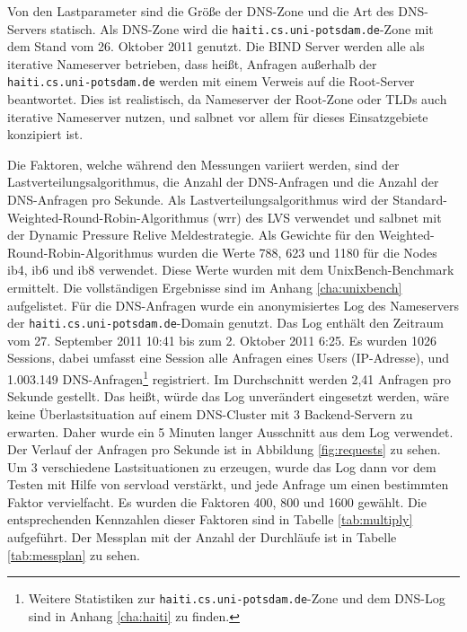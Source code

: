 \documentclass[a4paper, 12pt, BCOR10mm, DIV12, toc=bibliography, toc=listof, german]{scrbook}
\begin{document}
			Von den Lastparameter sind die Größe der DNS-Zone und die Art des DNS-Servers statisch. Als
			DNS-Zone wird die \texttt{haiti.cs.uni-potsdam.de}-Zone mit dem Stand vom 26.  Oktober 2011
			genutzt. Die BIND Server werden alle als iterative Nameserver betrieben, dass heißt, Anfragen
			außerhalb der \texttt{haiti.cs.uni-potsdam.de} werden mit einem Verweis auf die Root-Server
			beantwortet. Dies ist realistisch, da Nameserver der Root-Zone oder TLDs auch iterative
			Nameserver nutzen, und salbnet vor allem für dieses Einsatzgebiete konzipiert ist.

			Die Faktoren, welche während den Messungen variiert werden, sind der
			Lastverteilungsalgorithmus, die Anzahl der DNS-Anfragen und die Anzahl der DNS-Anfragen pro
			Sekunde. Als Lastverteilungsalgorithmus wird der Standard-Weighted-Round-Robin-Algorithmus
			(wrr) des LVS verwendet und salbnet mit der Dynamic Pressure Relive Meldestrategie. Als Gewichte
			für den Weighted-Round-Robin-Algorithmus wurden die Werte 788, 623 und 1180 für die Nodes ib4,
			ib6 und ib8 verwendet. Diese Werte wurden mit dem UnixBench-Benchmark \cite{unixbench}
			ermittelt. Die vollständigen Ergebnisse sind im Anhang \ref{cha:unixbench} aufgelistet. Für
			die DNS-Anfragen wurde ein anonymisiertes Log des Nameservers der
			\texttt{haiti.cs.uni-potsdam.de}-Domain genutzt. Das Log enthält den Zeitraum vom 27.
			September 2011 10:41 bis zum 2. Oktober 2011 6:25. Es wurden 1026 Sessions, dabei umfasst eine
			Session alle Anfragen eines Users (IP-Adresse), und 1.003.149 DNS-Anfragen\footnote{Weitere
			Statistiken zur \texttt{haiti.cs.uni-potsdam.de}-Zone und dem DNS-Log sind in Anhang
			\ref{cha:haiti} zu finden.} registriert. Im Durchschnitt werden 2,41 Anfragen pro Sekunde
			gestellt. Das heißt, würde das Log unverändert eingesetzt werden, wäre keine Überlastsituation
			auf einem DNS-Cluster mit 3 Backend-Servern zu erwarten. Daher wurde ein 5 Minuten langer
			Ausschnitt aus dem Log verwendet.  Der Verlauf der Anfragen pro Sekunde ist in Abbildung
			\ref{fig:requests} zu sehen. Um 3 verschiedene Lastsituationen zu erzeugen, wurde das Log
			dann vor dem Testen mit Hilfe von servload \cite{menski2012} verstärkt, und jede
			Anfrage um einen bestimmten Faktor vervielfacht. Es wurden die Faktoren 400, 800 und 1600
			gewählt. Die entsprechenden Kennzahlen dieser Faktoren sind in Tabelle \ref{tab:multiply}
			aufgeführt. Der Messplan mit der Anzahl der Durchläufe ist in Tabelle \ref{tab:messplan} zu
			sehen.
\end{document}
